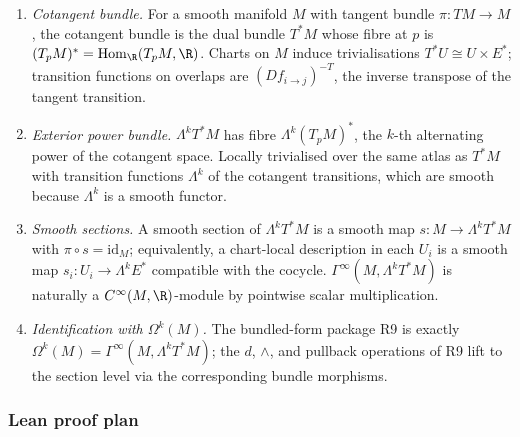 \begin{enumerate}
\item \emph{Cotangent bundle.}  For a smooth manifold \(M\) with
  tangent bundle \(\pi:TM\to M\), the cotangent bundle is the dual
  bundle \(T^{*}M\) whose fibre at \(p\) is
  \((T_{p}M)^{*}=\operatorname{Hom}_{\R}(T_{p}M,\R)\).  Charts on \(M\) induce
  trivialisations \(T^{*}U\cong U\times E^{*}\); transition functions
  on overlaps are \((Df_{i\to j})^{-T}\), the inverse transpose of
  the tangent transition.
\item \emph{Exterior power bundle.}  \(\Lambda^{k}T^{*}M\) has fibre
  \(\Lambda^{k}(T_{p}M)^{*}\), the \(k\)-th alternating power of the
  cotangent space.  Locally trivialised over the same atlas as
  \(T^{*}M\) with transition functions \(\Lambda^{k}\) of the
  cotangent transitions, which are smooth because \(\Lambda^{k}\) is
  a smooth functor.
\item \emph{Smooth sections.}  A smooth section of
  \(\Lambda^{k}T^{*}M\) is a smooth map \(s:M\to\Lambda^{k}T^{*}M\)
  with \(\pi\circ s=\mathrm{id}_{M}\); equivalently, a chart-local
  description in each \(U_{i}\) is a smooth map
  \(s_{i}:U_{i}\to\Lambda^{k}E^{*}\) compatible with the cocycle.
  \(\Gamma^{\infty}(M,\Lambda^{k}T^{*}M)\) is naturally a
  \(C^{\infty}(M,\R)\)-module by pointwise scalar multiplication.
\item \emph{Identification with \(\Omega^{k}(M)\).}  The
  bundled-form package R9 is exactly
  \(\Omega^{k}(M)=\Gamma^{\infty}(M,\Lambda^{k}T^{*}M)\); the \(d\),
  \(\wedge\), and pullback operations of R9 lift to the section
  level via the corresponding bundle morphisms.
\end{enumerate}

\subsubsection*{Lean proof plan}

